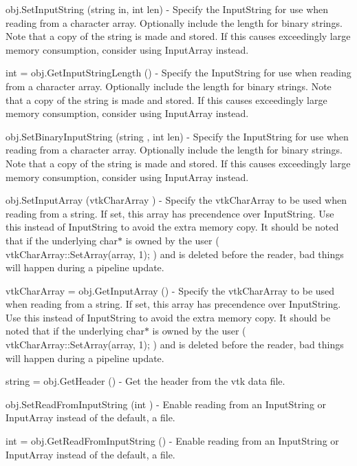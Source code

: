 \begin{DoxyItemize}
\item {\ttfamily obj.\-Set\-Input\-String (string in, int len)} -\/ Specify the Input\-String for use when reading from a character array. Optionally include the length for binary strings. Note that a copy of the string is made and stored. If this causes exceedingly large memory consumption, consider using Input\-Array instead.  
\item {\ttfamily int = obj.\-Get\-Input\-String\-Length ()} -\/ Specify the Input\-String for use when reading from a character array. Optionally include the length for binary strings. Note that a copy of the string is made and stored. If this causes exceedingly large memory consumption, consider using Input\-Array instead.  
\item {\ttfamily obj.\-Set\-Binary\-Input\-String (string , int len)} -\/ Specify the Input\-String for use when reading from a character array. Optionally include the length for binary strings. Note that a copy of the string is made and stored. If this causes exceedingly large memory consumption, consider using Input\-Array instead.  
\item {\ttfamily obj.\-Set\-Input\-Array (vtk\-Char\-Array )} -\/ Specify the vtk\-Char\-Array to be used when reading from a string. If set, this array has precendence over Input\-String. Use this instead of Input\-String to avoid the extra memory copy. It should be noted that if the underlying char$\ast$ is owned by the user ( vtk\-Char\-Array\-::\-Set\-Array(array, 1); ) and is deleted before the reader, bad things will happen during a pipeline update.  
\item {\ttfamily vtk\-Char\-Array = obj.\-Get\-Input\-Array ()} -\/ Specify the vtk\-Char\-Array to be used when reading from a string. If set, this array has precendence over Input\-String. Use this instead of Input\-String to avoid the extra memory copy. It should be noted that if the underlying char$\ast$ is owned by the user ( vtk\-Char\-Array\-::\-Set\-Array(array, 1); ) and is deleted before the reader, bad things will happen during a pipeline update.  
\item {\ttfamily string = obj.\-Get\-Header ()} -\/ Get the header from the vtk data file.  
\item {\ttfamily obj.\-Set\-Read\-From\-Input\-String (int )} -\/ Enable reading from an Input\-String or Input\-Array instead of the default, a file.  
\item {\ttfamily int = obj.\-Get\-Read\-From\-Input\-String ()} -\/ Enable reading from an Input\-String or Input\-Array instead of the default, a file.  

\end{DoxyItemize}
